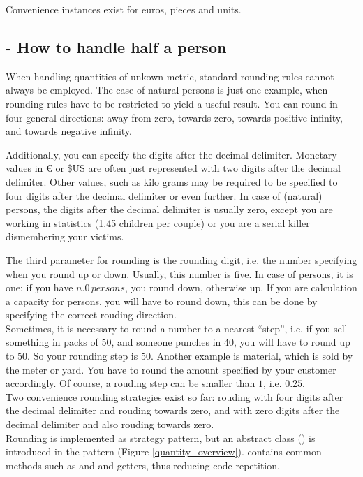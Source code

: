Convenience instances exist for euros, pieces and units.

\subsection{ - How to handle half a person}
When handling quantities of unkown metric, standard rounding rules cannot always be employed.
The case of natural persons is just one example, when rounding rules have to be restricted to yield a useful result.
You can round in four general directions: away from zero, towards zero, towards positive infinity, and towards negative infinity.

Additionally, you can specify the digits after the decimal delimiter.
Monetary values in \euro{} or \$US are often just represented with two digits after the decimal delimiter.
Other values, such as kilo grams may be required to be specified to four digits after the decimal delimiter or even further.
In case of (natural) persons, the digits after the decimal delimiter is usually zero, except you are working in statistics (1.45 children per couple) or you are a serial killer dismembering your victims.

The third parameter for rounding is the rounding digit, i.e. the number specifying when you round up or down.
Usually, this number is five.
In case of persons, it is one: if you have $n.0\,persons$, you round down, otherwise up.
If you are calculation a capacity for persons, you will have to round down, this can be done by specifying the correct rouding direction.
\\

Sometimes, it is necessary to round a number to a nearest ``step'', i.e. if you sell something in packs of $50$, and someone punches in $40$, you will have to round up to $50$.
So your rounding step is $50$.
Another example is material, which is sold by the meter or yard.
You have to round the amount specified by your customer accordingly.
Of course, a rouding step can be smaller than $1$, i.e. $0.25$.
\\

Two convenience rounding strategies exist so far:  rouding with four digits after the decimal delimiter and rouding towards zero, and  with zero digits after the decimal delimiter and also rouding towards zero.
\\

Rounding is implemented as strategy pattern, but an abstract class () is introduced in the pattern (Figure \ref{quantity_overview}).
 contains common methods such as  and  and getters, thus reducing code repetition.
